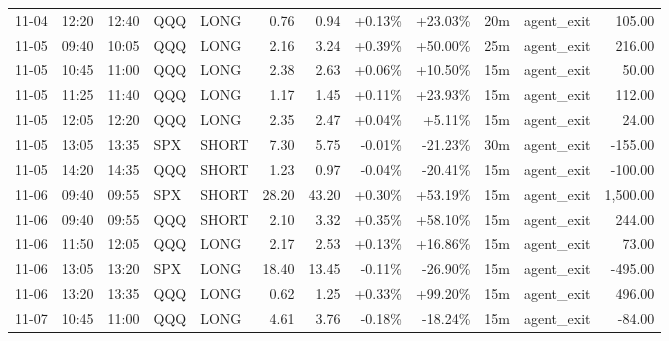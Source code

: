 \documentclass[11pt,a4paper]{article}
\begin{document}
\begin{center}
\begin{longtable}{>{\color{txtmain}}l l l l l r r r r r >{\color{txtmain}}l r}
11-04 & 12:20 & 12:40 & QQQ & LONG & 0.76 & 0.94 & \textcolor{wingreen}{+0.13\%} & \textcolor{wingreen}{+23.03\%} & 20m & agent\_exit & \textcolor{wingreen}{105.00} \\
11-05 & 09:40 & 10:05 & QQQ & LONG & 2.16 & 3.24 & \textcolor{wingreen}{+0.39\%} & \textcolor{wingreen}{+50.00\%} & 25m & agent\_exit & \textcolor{wingreen}{216.00} \\
11-05 & 10:45 & 11:00 & QQQ & LONG & 2.38 & 2.63 & \textcolor{wingreen}{+0.06\%} & \textcolor{wingreen}{+10.50\%} & 15m & agent\_exit & \textcolor{wingreen}{50.00} \\
11-05 & 11:25 & 11:40 & QQQ & LONG & 1.17 & 1.45 & \textcolor{wingreen}{+0.11\%} & \textcolor{wingreen}{+23.93\%} & 15m & agent\_exit & \textcolor{wingreen}{112.00} \\
11-05 & 12:05 & 12:20 & QQQ & LONG & 2.35 & 2.47 & \textcolor{wingreen}{+0.04\%} & \textcolor{wingreen}{+5.11\%} & 15m & agent\_exit & \textcolor{wingreen}{24.00} \\
11-05 & 13:05 & 13:35 & SPX & SHORT & 7.30 & 5.75 & \textcolor{lossred}{-0.01\%} & \textcolor{lossred}{-21.23\%} & 30m & agent\_exit & \textcolor{lossred}{-155.00} \\
11-05 & 14:20 & 14:35 & QQQ & SHORT & 1.23 & 0.97 & \textcolor{lossred}{-0.04\%} & \textcolor{lossred}{-20.41\%} & 15m & agent\_exit & \textcolor{lossred}{-100.00} \\
11-06 & 09:40 & 09:55 & SPX & SHORT & 28.20 & 43.20 & \textcolor{wingreen}{+0.30\%} & \textcolor{wingreen}{+53.19\%} & 15m & agent\_exit & \textcolor{wingreen}{1,500.00} \\
11-06 & 09:40 & 09:55 & QQQ & SHORT & 2.10 & 3.32 & \textcolor{wingreen}{+0.35\%} & \textcolor{wingreen}{+58.10\%} & 15m & agent\_exit & \textcolor{wingreen}{244.00} \\
11-06 & 11:50 & 12:05 & QQQ & LONG & 2.17 & 2.53 & \textcolor{wingreen}{+0.13\%} & \textcolor{wingreen}{+16.86\%} & 15m & agent\_exit & \textcolor{wingreen}{73.00} \\
11-06 & 13:05 & 13:20 & SPX & LONG & 18.40 & 13.45 & \textcolor{lossred}{-0.11\%} & \textcolor{lossred}{-26.90\%} & 15m & agent\_exit & \textcolor{lossred}{-495.00} \\
11-06 & 13:20 & 13:35 & QQQ & LONG & 0.62 & 1.25 & \textcolor{wingreen}{+0.33\%} & \textcolor{wingreen}{+99.20\%} & 15m & agent\_exit & \textcolor{wingreen}{496.00} \\
11-07 & 10:45 & 11:00 & QQQ & LONG & 4.61 & 3.76 & \textcolor{lossred}{-0.18\%} & \textcolor{lossred}{-18.24\%} & 15m & agent\_exit & \textcolor{lossred}{-84.00} \\

\end{longtable}
\end{center}
\end{document}
